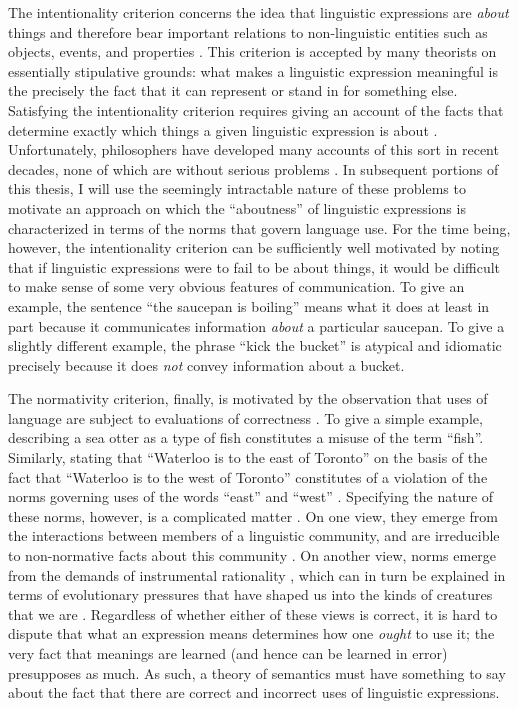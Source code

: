 The intentionality criterion concerns the idea that linguistic expressions are \textit{about} things and therefore bear important relations to non-linguistic entities such as objects, events, and properties \citep{Speaks:2014,Stanley:2008}. This criterion is accepted by many theorists on essentially stipulative grounds: what makes a linguistic expression meaningful is the precisely the fact that it can represent or stand in for something else. Satisfying the intentionality criterion requires giving an account of the facts that determine exactly which things a given linguistic expression is about \citep{Horwich:1998,Brandom:2000}. Unfortunately, philosophers have developed many accounts of this sort in recent decades, none of which are without serious problems \citep{Horwich:2005}. In subsequent portions of this thesis, I will use the seemingly intractable nature of these problems to motivate an approach on which the ``aboutness'' of linguistic expressions is characterized in terms of the norms that govern language use. For the time being, however, the intentionality criterion can be sufficiently well motivated by noting that if linguistic expressions were to fail to be about things, it would be difficult to make sense of some very obvious features of communication. To give an example, the sentence ``the saucepan is boiling'' means what it does at least in part because it communicates information \textit{about} a particular saucepan. To give a slightly different example, the phrase ``kick the bucket'' is atypical and idiomatic precisely because it does \textit{not} convey information about a bucket.
 
The normativity criterion, finally, is motivated by the observation that uses of language are subject to evaluations of correctness \citep{Wittgenstein:1953,Brandom:1994,Brandom:2000,Brandom:2009,Sellars:1954,Kripke:1982}. To give a simple example, describing a sea otter as a type of fish constitutes a misuse of the term ``fish''. Similarly, stating that ``Waterloo is to the east of Toronto'' on the basis of the fact that ``Waterloo is to the west of Toronto'' constitutes of a violation of the norms governing uses of the words ``east'' and ``west'' \citep[i.e., they are not synonyms; see][p. 98]{Brandom:1994}. Specifying the nature of these norms, however, is a complicated matter \citep{Brandom:1994,Kripke:1982}. On one view, they emerge from the interactions between members of a linguistic community, and are irreducible to non-normative facts about this community \citep{Brandom:1994}. On another view, norms emerge from the demands of instrumental rationality \citep{Horwich:1998}, which can in turn be explained in terms of evolutionary pressures that have shaped us into the kinds of creatures that we are \citep{Dennett:1987,Dennett:2010}. Regardless of whether either of these views is correct, it is hard to dispute that what an expression means determines how one \textit{ought} to use it; the very fact that meanings are learned (and hence can be learned in error) presupposes as much. As such, a theory of semantics must have something to say about the fact that there are correct and incorrect uses of linguistic expressions.

